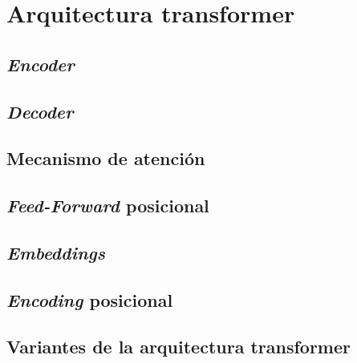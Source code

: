 \chapter{Arquitectura transformer}
\section{\textit{Encoder}}
\section{\textit{Decoder}}
\section{Mecanismo de atención}
\section{\textit{Feed-Forward} posicional}
\section{\textit{Embeddings}}
\section{\textit{Encoding} posicional}
\section{Variantes de la arquitectura transformer} \label{transfvariants}
\cite{Tay2020Sep, Lin2021Jun}
